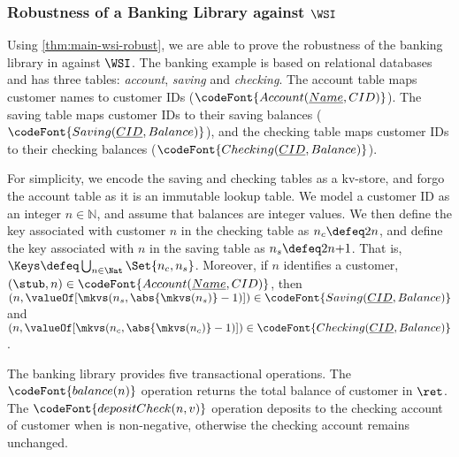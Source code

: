 \subsubsection{Robustness of a Banking Library against $\WSI$}

Using \cref{thm:main-wsi-robust},
we are able to prove the robustness of the banking library in \citet{bank-example-wsi} against \( \WSI \).
The banking example is based on relational databases and has three tables: \emph{account}, \emph{saving} and \emph{checking}.
The account table maps customer names to customer IDs (\( \codeFont{Account(\underline{Name}, CID )} \)).
The saving table maps customer IDs to their saving balances (\( \codeFont{Saving(\underline{CID}, Balance )} \)), and
the checking table maps customer IDs to their checking balances (\( \codeFont{Checking(\underline{CID}, Balance )} \)).

For simplicity, we encode the saving and checking tables as a kv-store,
and forgo the account table as it is an immutable lookup table.
We model a customer ID as an integer \( n \in \mathbb{N}\), and assume that balances are integer values. 
We then define the key associated with customer $n$ in the checking table as 
$n_c \defeq 2 n$,
and define the key associated with $n$ in the saving table as 
$n_s \defeq 2n {+} 1$. 
That is, \( \Keys \defeq \bigcup_{n \in \Nat} \Set{n_c, n_s} \).
Moreover, if \( n \) identifies a customer, \ie $(\stub, n) \in \codeFont{Account(\underline{Name}, CID )}$,
then
\( (n, \valueOf[\mkvs(n_s, \abs{\mkvs(n_s)} - 1)]) \in \codeFont{Saving(\underline{CID}, Balance )} \)
and \( (n, \valueOf[\mkvs(n_c, \abs{\mkvs(n_c)} - 1)]) \in \codeFont{Checking(\underline{CID}, Balance )} \).

The banking library provides five transactional operations.
The \( \codeFont{balance(n)} \) operation returns the total balance of customer  in  \( \ret \).
The \( \codeFont{depositCheck(n,v)} \) operation deposits  to the checking account of customer  when  is non-negative,
otherwise the checking account remains unchanged.


